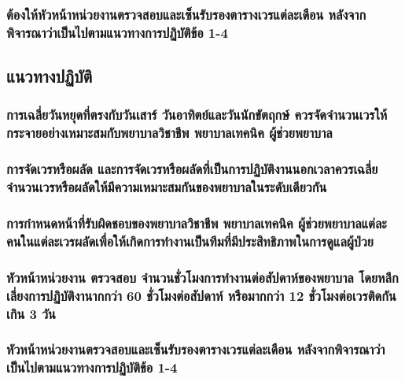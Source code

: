 \hspace{0.5cm}\hangindent=2.6cm\subsubsection{ต้องให้หัวหน้าหน่วยงานตรวจสอบและเซ็นรับรองตารางเวรแต่ละเดือน หลังจากพิจารณาว่าเป็นไปตามแนวทางการปฏิบัติข้อ 1-4}

\vspace{0.5cm}

\hspace{0pt}\subsection{แนวทางปฏิบัติ}

\hspace{0.5cm}\hangindent=2.6cm\subsubsection{การเฉลี่ยวันหยุดที่ตรงกับวันเสาร์ วันอาทิตย์และวันนักขัตฤกษ์ ควรจัดจำนวนเวรให้กระจายอย่างเหมาะสมกับพยาบาลวิชาชีพ พยาบาลเทคนิค ผู้ช่วยพยาบาล}

\hspace{0.5cm}\hangindent=2.6cm\subsubsection{การจัดเวรหรือผลัด และการจัดเวรหรือผลัดที่เป็นการปฏิบัติงานนอกเวลาควรเฉลี่ยจำนวนเวรหรือผลัดให้มีความเหมาะสมกันของพยาบาลในระดับเดียวกัน}

\hspace{0.5cm}\hangindent=2.6cm\subsubsection{การกำหนดหน้าที่รับผิดชอบของพยาบาลวิชาชีพ พยาบาลเทคนิค ผู้ช่วยพยาบาลแต่ละคนในแต่ละเวรผลัดเพื่อให้เกิดการทำงานเป็นทีมที่มีประสิทธิภาพในการดูแลผู้ป่วย}

\hspace{0.5cm}\hangindent=2.6cm\subsubsection{หัวหน้าหน่วยงาน ตรวจสอบ จำนวนชั่วโมงการทำงานต่อสัปดาห์ของพยาบาล โดยหลีกเลี่ยงการปฏิบัติงานากกว่า 60 ชั่วโมงต่อสัปดาห์ หรือมากกว่า 12 ชั่วโมงต่อเวรติดกันเกิน 3 วัน}

\hspace{0.5cm}\hangindent=2.6cm\subsubsection{หัวหน้าหน่วยงานตรวจสอบและเซ็นรับรองตารางเวรแต่ละเดือน หลังจากพิจารณาว่าเป็นไปตามแนวทางการปฏิบัติข้อ 1-4}


